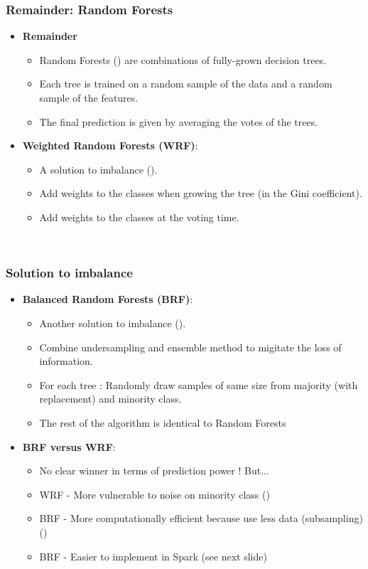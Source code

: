 \documentclass[slidestop,compress,red,mathserif]{beamer}
\begin{document}
\begin{frame}
\frametitle{Remainder: Random Forests}
\begin{itemize}
  \item[] \textbf{Remainder}
    \begin{itemize}
    	\item Random Forests (\cite{Breiman2001}) are combinations of fully-grown decision trees.
    	\item Each tree is trained on a random sample of the data and a random sample of the features.
      \item The final prediction is given by averaging the votes of the trees.
    \end{itemize}

  \item[] \textbf{Weighted Random Forests (WRF)}:
    \begin{itemize}
      \item A solution to imbalance (\cite{Chen2004}).
      \item Add weights to the classes when growing the tree (in the Gini coefficient).
      \item Add weights to the classes at the voting time.
    \end{itemize}

\end{itemize}
~~~~~~~~~~~~~~~
\end{frame}


\begin{frame}
\frametitle{Solution to imbalance}
\begin{itemize}
  \item[] \textbf{Balanced Random Forests (BRF)}:
    \begin{itemize}
      \item Another solution to imbalance (\cite{Chen2004}).
      \item Combine undersampling and ensemble method to migitate the loss of information.
      \item For each tree : Randomly draw samples of same size from majority (with replacement) and minority class.
      \item The rest of the algorithm is identical to Random Forests
    \end{itemize}

  \item[] \textbf{BRF versus WRF}:
    \begin{itemize}
      \item No clear winner in terms of prediction power ! But...
      \item WRF - More vulnerable to noise on minority class (\cite{Chen2004})
      \item BRF - More computationally efficient because use less data (subsampling) (\cite{Chen2004})
      \item BRF - Easier to implement in Spark (see next slide)
    \end{itemize}

\end{itemize}
\end{frame}
\end{document}
